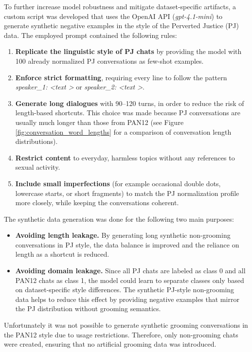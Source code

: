 To further increase model robustness and mitigate dataset-specific artifacts, a custom script was developed that  uses the OpenAI API (\textit{gpt-4.1-mini}) to generate synthetic negative examples in the style of the Perverted Justice (PJ) data. The employed prompt contained the following rules:
\begin{enumerate}
\item \textbf{Replicate the linguistic style of PJ chats} by providing the model with 100 already normalized PJ conversations as few-shot examples.
\item \textbf{Enforce strict formatting}, requiring every line to follow the pattern \textit{speaker\_1: \textless text \textgreater} or \textit{speaker\_2: \textless text \textgreater}.
\item \textbf{Generate long dialogues} with 90–120 turns, in order to reduce the risk of length-based shortcuts. This choice was made because PJ conversations are usually much longer than those from PAN12 (see Figure \ref{fig:conversation_word_lengths} for a comparison of conversation length distributions).
\item \textbf{Restrict content} to everyday, harmless topics without any references to sexual activity.
\item \textbf{Include small imperfections} (for example occasional double dots, lowercase starts, or short fragments) to match the PJ normalization profile more closely, while keeping the conversations coherent.
\end{enumerate}

The synthetic data generation was done for the following two main purposes:

\begin{itemize}
    \item \textbf{Avoiding length leakage.} By generating long synthetic non-grooming conversations in PJ style, the data balance is improved and the reliance on length as a shortcut is reduced.
    \item \textbf{Avoiding domain leakage.} Since all PJ chats are labeled as class 0 and all PAN12 chats as class 1, the model could learn to separate classes only based on dataset-specific style differences. The synthetic PJ-style non-grooming data helps to reduce this effect by providing negative examples that mirror the PJ distribution without grooming semantics.
\end{itemize}

Unfortunately it was not possible to generate synthetic grooming conversations in the PAN12 style due to usage restrictions. Therefore, only non-grooming chats were created, ensuring that no artificial grooming data was introduced.



